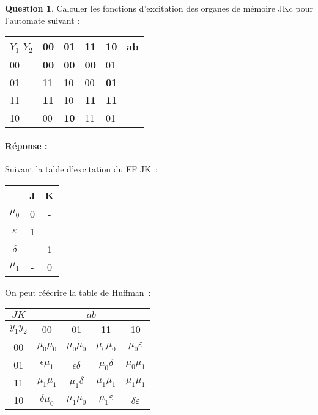 \documentclass[11pt,a4paper]{article}
\theoremstyle{definition}%
\newtheorem{Q}{Question}[] %
\newcommand{\reponse}[1]{%
	\ifthenelse {\boolean{corrige}} {\paragraph{Réponse :} \color{darkblue}   #1\color{black}} {}
 }
\begin{document}
\begin{Q}
Calculer les fonctions d'excitation des organes de mémoire JKc pour l'automate suivant :


\begin{center}
	\begin{tabular}{|l|l|l|l|l|l}
	\hline
	$Y_1$ $Y_2$ & 00         & 01         & 11         & 10         & \multicolumn{1}{l|}{ab} \\ \hline
	00           & \textbf{00} & \textbf{00} & \textbf{00} & 01          &                         \\ \cline{1-5}
	01           & 11          & 10          & 00          & \textbf{01} &                         \\ \cline{1-5}
	11           & \textbf{11} & 10          & \textbf{11} & \textbf{11} &                         \\ \cline{1-5}
	10           & 00          & \textbf{10} & 11          & 01          &                         \\ \cline{1-5}
	\end{tabular}
\end{center}


\reponse{
	Suivant la table d'excitation du FF JK~:
	\begin{center}
		\begin{tabular}{c|cc}
			& J & K \\ \hline
			$\mu_0$ & 0 & - \\
			$\varepsilon$ & 1 & - \\
			$\delta$ & - & 1 \\
			$\mu_1$ & - & 0
		\end{tabular}
	\end{center}

	On peut réécrire la table de Huffman~:
	\begin{center}
		\begin{tabular}{|c|c|c|c|c|}\hline
		$JK$ & \multicolumn{4}{c|}{$ab$} \\ \hline
		$y_1y_2$ & 00 & 01 & 11 & 10 \\ \hline
		00 & $\mu_0\mu_0$ & $\mu_0\mu_0$ & $\mu_0\mu_0$ & $\mu_0\varepsilon$ \\ \hline
		01 & $\epsilon\mu_1$ & $\epsilon\delta$ & $\mu_0\delta$ & $\mu_0\mu_1$ \\ \hline
		11 & $\mu_1\mu_1$ & $\mu_1\delta$ & $\mu_1\mu_1$ & $\mu_1\mu_1$ \\ \hline
		10 & $\delta\mu_0$ & $\mu_1\mu_0$ & $\mu_1\varepsilon$ & $\delta\varepsilon$ \\ \hline
		\end{tabular}
	\end{center}

}
\end{Q}
\end{document}
